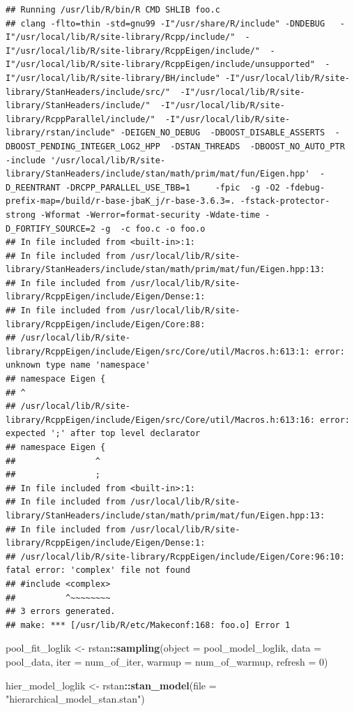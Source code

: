 \documentclass[
]{article}
\newenvironment{Shaded}{\begin{snugshade}}{\end{snugshade}}
\newcommand{\DataTypeTok}[1]{\textcolor[rgb]{0.13,0.29,0.53}{#1}}
\newcommand{\DecValTok}[1]{\textcolor[rgb]{0.00,0.00,0.81}{#1}}
\newcommand{\KeywordTok}[1]{\textcolor[rgb]{0.13,0.29,0.53}{\textbf{#1}}}
\newcommand{\NormalTok}[1]{#1}
\newcommand{\OperatorTok}[1]{\textcolor[rgb]{0.81,0.36,0.00}{\textbf{#1}}}
\newcommand{\StringTok}[1]{\textcolor[rgb]{0.31,0.60,0.02}{#1}}
\begin{document}
\begin{verbatim}
## Running /usr/lib/R/bin/R CMD SHLIB foo.c
## clang -flto=thin -std=gnu99 -I"/usr/share/R/include" -DNDEBUG   -I"/usr/local/lib/R/site-library/Rcpp/include/"  -I"/usr/local/lib/R/site-library/RcppEigen/include/"  -I"/usr/local/lib/R/site-library/RcppEigen/include/unsupported"  -I"/usr/local/lib/R/site-library/BH/include" -I"/usr/local/lib/R/site-library/StanHeaders/include/src/"  -I"/usr/local/lib/R/site-library/StanHeaders/include/"  -I"/usr/local/lib/R/site-library/RcppParallel/include/"  -I"/usr/local/lib/R/site-library/rstan/include" -DEIGEN_NO_DEBUG  -DBOOST_DISABLE_ASSERTS  -DBOOST_PENDING_INTEGER_LOG2_HPP  -DSTAN_THREADS  -DBOOST_NO_AUTO_PTR  -include '/usr/local/lib/R/site-library/StanHeaders/include/stan/math/prim/mat/fun/Eigen.hpp'  -D_REENTRANT -DRCPP_PARALLEL_USE_TBB=1     -fpic  -g -O2 -fdebug-prefix-map=/build/r-base-jbaK_j/r-base-3.6.3=. -fstack-protector-strong -Wformat -Werror=format-security -Wdate-time -D_FORTIFY_SOURCE=2 -g  -c foo.c -o foo.o
## In file included from <built-in>:1:
## In file included from /usr/local/lib/R/site-library/StanHeaders/include/stan/math/prim/mat/fun/Eigen.hpp:13:
## In file included from /usr/local/lib/R/site-library/RcppEigen/include/Eigen/Dense:1:
## In file included from /usr/local/lib/R/site-library/RcppEigen/include/Eigen/Core:88:
## /usr/local/lib/R/site-library/RcppEigen/include/Eigen/src/Core/util/Macros.h:613:1: error: unknown type name 'namespace'
## namespace Eigen {
## ^
## /usr/local/lib/R/site-library/RcppEigen/include/Eigen/src/Core/util/Macros.h:613:16: error: expected ';' after top level declarator
## namespace Eigen {
##                ^
##                ;
## In file included from <built-in>:1:
## In file included from /usr/local/lib/R/site-library/StanHeaders/include/stan/math/prim/mat/fun/Eigen.hpp:13:
## In file included from /usr/local/lib/R/site-library/RcppEigen/include/Eigen/Dense:1:
## /usr/local/lib/R/site-library/RcppEigen/include/Eigen/Core:96:10: fatal error: 'complex' file not found
## #include <complex>
##          ^~~~~~~~~
## 3 errors generated.
## make: *** [/usr/lib/R/etc/Makeconf:168: foo.o] Error 1
\end{verbatim}

\begin{Shaded}
\begin{Highlighting}[]
\NormalTok{pool\_fit\_loglik \textless{}{-}}\StringTok{ }\NormalTok{rstan}\OperatorTok{::}\KeywordTok{sampling}\NormalTok{(}\DataTypeTok{object =}\NormalTok{ pool\_model\_loglik,}
                            \DataTypeTok{data =}\NormalTok{ pool\_data,}
                            \DataTypeTok{iter =}\NormalTok{ num\_of\_iter,}
                            \DataTypeTok{warmup =}\NormalTok{ num\_of\_warmup,}
                            \DataTypeTok{refresh =} \DecValTok{0}\NormalTok{)}

\NormalTok{hier\_model\_loglik \textless{}{-}}\StringTok{ }\NormalTok{rstan}\OperatorTok{::}\KeywordTok{stan\_model}\NormalTok{(}\DataTypeTok{file =} \StringTok{"hierarchical\_model\_stan.stan"}\NormalTok{)}
\end{Highlighting}
\end{Shaded}
\end{document}
